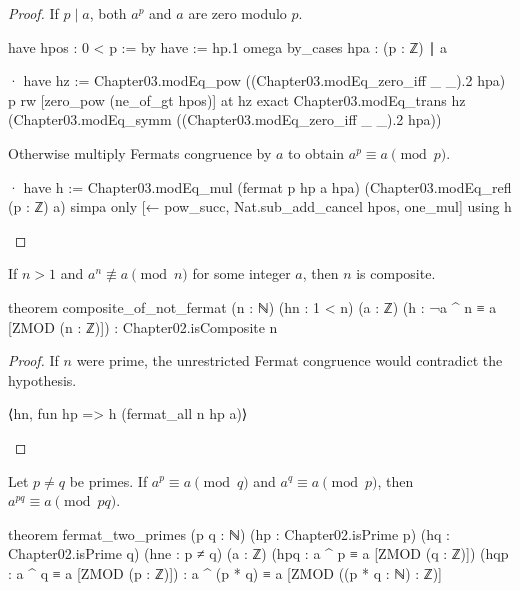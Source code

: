\begin{proof}
  If $p\mid a$, both $a^p$ and $a$ are zero modulo $p$.

  \begin{lean}
    have hpos : 0 < p := by
      have := hp.1
      omega
    by_cases hpa : (p : ℤ) ∣ a

    · have hz := Chapter03.modEq_pow ((Chapter03.modEq_zero_iff _ _).2 hpa) p
      rw [zero_pow (ne_of_gt hpos)] at hz
      exact Chapter03.modEq_trans hz
        (Chapter03.modEq_symm ((Chapter03.modEq_zero_iff _ _).2 hpa))
  \end{lean}

  Otherwise multiply Fermat\textquotesingle s congruence by $a$ to obtain $a^p\equiv a\pmod p$.

  \begin{lean}
    · have h := Chapter03.modEq_mul (fermat p hp a hpa) (Chapter03.modEq_refl (p : ℤ) a)
      simpa only [← pow_succ, Nat.sub_add_cancel hpos, one_mul] using h
  \end{lean}
\end{proof}

\begin{theorem}
  \label{ent:thm:composite-of-not-fermat}
  If $n>1$ and $a^n\not\equiv a\pmod n$ for some integer $a$, then $n$ is composite.

  \begin{lean}
    theorem composite_of_not_fermat (n : ℕ) (hn : 1 < n) (a : ℤ)
        (h : ¬a ^ n ≡ a [ZMOD (n : ℤ)]) : Chapter02.isComposite n
  \end{lean}
\end{theorem}

\begin{proof}
  If $n$ were prime, the unrestricted Fermat congruence would contradict the hypothesis.

  \begin{lean}
    ⟨hn, fun hp => h (fermat_all n hp a)⟩
  \end{lean}
\end{proof}

\begin{theorem}
  \label{ent:thm:fermat-two-primes}
  Let $p\ne q$ be primes.
  If $a^p\equiv a\pmod q$ and $a^q\equiv a\pmod p$, then $a^{pq}\equiv a\pmod{pq}$.

  \begin{lean}
    theorem fermat_two_primes (p q : ℕ) (hp : Chapter02.isPrime p)
        (hq : Chapter02.isPrime q) (hne : p ≠ q) (a : ℤ)
        (hpq : a ^ p ≡ a [ZMOD (q : ℤ)]) (hqp : a ^ q ≡ a [ZMOD (p : ℤ)]) :
        a ^ (p * q) ≡ a [ZMOD ((p * q : ℕ) : ℤ)]
  \end{lean}
\end{theorem}

